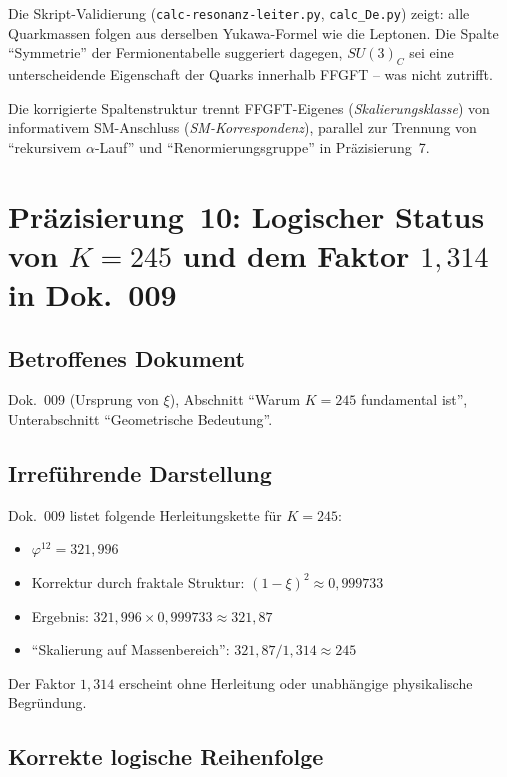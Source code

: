 Die Skript-Validierung (\texttt{calc-resonanz-leiter.py},
\texttt{calc\_De.py}) zeigt: alle Quarkmassen folgen aus derselben
Yukawa-Formel wie die Leptonen. Die Spalte \enquote{Symmetrie} der
Fermionentabelle suggeriert dagegen, $SU(3)_C$ sei eine
unterscheidende Eigenschaft der Quarks innerhalb FFGFT -- was nicht
zutrifft.

Die korrigierte Spaltenstruktur trennt FFGFT-Eigenes
(\emph{Skalierungsklasse}) von informativem SM-Anschluss
(\emph{SM-Korrespondenz}), parallel zur Trennung von
\enquote{rekursivem $\alpha$-Lauf} und \enquote{Renormierungsgruppe} in
Präzisierung~7.

\section{\texorpdfstring{Präzisierung~10: Logischer Status von $K = 245$ und dem Faktor $1{,}314$ in Dok.~009}{Präzisierung 10: Logischer Status von K = 245 und dem Faktor 1.314 in Dok. 009}}

\subsection*{Betroffenes Dokument}

Dok.~009 (Ursprung von $\xi$), Abschnitt \enquote{Warum $K = 245$ fundamental ist},
Unterabschnitt \enquote{Geometrische Bedeutung}.

\subsection*{Irreführende Darstellung}

Dok.~009 listet folgende Herleitungskette für $K = 245$:
\begin{itemize}
  \item $\varphi^{12} = 321{,}996$
  \item Korrektur durch fraktale Struktur: $(1-\xi)^2 \approx 0{,}999733$
  \item Ergebnis: $321{,}996 \times 0{,}999733 \approx 321{,}87$
  \item \enquote{Skalierung auf Massenbereich}: $321{,}87 / 1{,}314 \approx 245$
\end{itemize}
Der Faktor $1{,}314$ erscheint ohne Herleitung oder unabhängige
physikalische Begründung.

\subsection*{Korrekte logische Reihenfolge}

